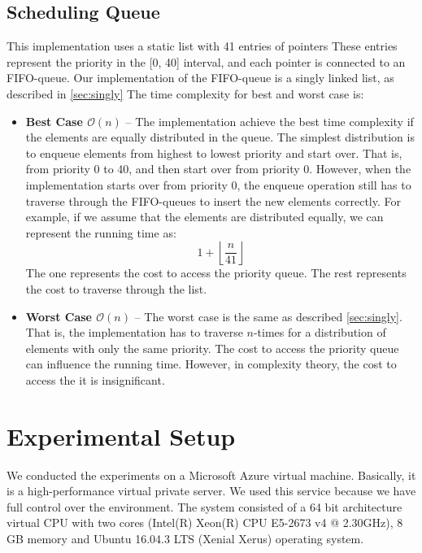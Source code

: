 \documentclass[a4paper,11pt]{kth-mag}
\newcommand\floor[1]{\lfloor#1\rfloor}
\begin{document}
\subsection{Scheduling Queue}
This implementation uses a static list with 41 entries of pointers
These entries represent the priority in the [0, 40] interval, and each pointer is connected to an FIFO-queue.
Our implementation of the FIFO-queue is a singly linked list, as described in \cref{sec:singly}
The time complexity for best and worst case is:
\begin{itemize}
    \item \textbf{Best Case $\mathcal{O}(n)$} -- The implementation achieve the best time complexity if the elements are equally distributed in the queue.
        The simplest distribution is to enqueue elements from highest to lowest priority and start over.
        That is, from priority 0 to 40, and then start over from priority 0.
        However, when the implementation starts over from priority 0, the enqueue operation still has to traverse through the FIFO-queues to insert the new elements correctly.
        For example, if we assume that the elements are distributed equally, we can represent the running time as:
        \begin{equation*}
            1 + \left\floor{\frac{n}{41}\right}
        \end{equation*}
        The one represents the cost to access the priority queue.
        The rest represents the cost to traverse through the list.
    \item \textbf{Worst Case $\mathcal{O}(n)$} -- The worst case is the same as described \cref{sec:singly}.
        That is, the implementation has to traverse $n$-times for a distribution of elements with only the same priority.
        The cost to access the priority queue can influence the running time.
        However, in complexity theory, the cost to access the it is insignificant.
\end{itemize}



\section{Experimental Setup}
We conducted the experiments on a Microsoft Azure virtual machine.
Basically, it is a high-performance virtual private server.
We used this service because we have full control over the environment.
The system consisted of a 64 bit architecture virtual CPU with two cores (Intel(R) Xeon(R) CPU E5-2673 v4 @ 2.30GHz), 8 GB memory and Ubuntu 16.04.3 LTS (Xenial Xerus) operating system.
\end{document}
